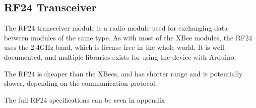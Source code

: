 \subsection{RF24 Transceiver}
The RF24 transceiver module is a radio module used for exchanging data between modules of the same type. As with most of the XBee modules, the RF24 uses the 2.4GHz band, which is license-free in the whole world. It is well documented, and multiple libraries exists for using the device with Arduino.

The RF24 is cheaper than the XBees, and has shorter range and is potentially slower, depending on the communication protocol.

The full RF24 specifications can be seen in appendix 

